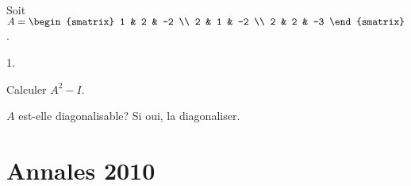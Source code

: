 \documentclass[11pt]{article}%
\begin{document}
\begin{exerciceSP}~\\
  Soit $A = 
  \begin{smatrix} 
    1 & 2 & -2 \\ 
    2 & 1 & -2 \\ 
    2 & 2 & -3
  \end{smatrix}$.
  \begin{noliste}{1.}
    \setlength{\itemsep}{2mm}
  \item Calculer $A^2 - I$.
  \item $A$ est-elle diagonalisable? Si oui, la diagonaliser.

  \end{noliste}
\end{exerciceSP}


\newpage


\section{Annales 2010}
\end{document}
